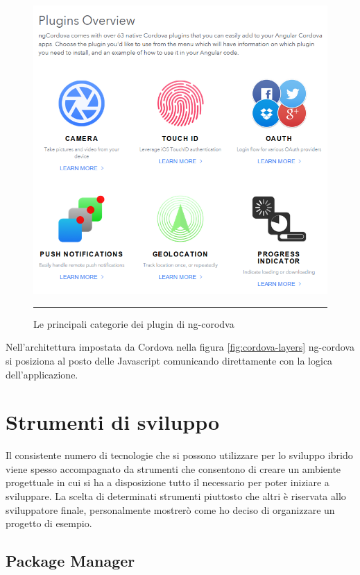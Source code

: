 \begin{figure}[!h]
  \centering
    \includegraphics[scale=0.66]{Figures/ngcordova-plugins.png} 
    \rule{35em}{0.5pt}
  \caption[ngCordova Plugin]{Le principali categorie dei plugin di ng-corodva}
  \label{fig:ngcordova-plugins}
\end{figure}

Nell'architettura impostata da Cordova nella figura \ref{fig:cordova-layers} ng-cordova si posiziona al posto delle Javascript comunicando direttamente con la logica dell'applicazione.

\section{Strumenti di sviluppo}

Il consistente numero di tecnologie che si possono utilizzare per lo sviluppo ibrido viene spesso accompagnato da strumenti che consentono di creare un ambiente progettuale in cui si ha a disposizione tutto il necessario per poter iniziare a sviluppare. La scelta di determinati strumenti piuttosto che altri è riservata allo sviluppatore finale, personalmente mostrerò come ho deciso di organizzare un progetto di esempio.

\subsection{Package Manager}

